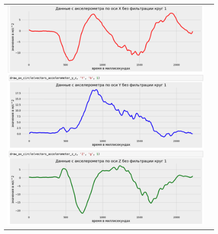 \begin{figure}[H]
    \begin{center}
        \begin{tabular}{cc}
            \includegraphics[width=1\textwidth]{farim/cirx} & 
        \end{tabular}
    \end{center}
\end{figure}


